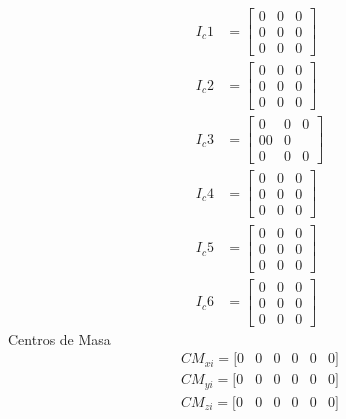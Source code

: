 \documentclass[journal]{IEEEtran}
\begin{document}
    \begin{align*}
    I_c{1} & =\begin{bmatrix}
    0 &	0 &	0 \\ 0 &	0 &	0 \\
    0 &	0 &	0\end{bmatrix} \\
    I_c{2} & =\begin{bmatrix}
    0 &	0 &	0    \\
    0  &	0 &	0 \\
    0	& 0 &	0\end{bmatrix} \\
    I_c{3} & =\begin{bmatrix}
    0 &	0	& 0 \\0	0 & 0 \\
    0 & 0 & 0\end{bmatrix}\\
    I_c{4} & =\begin{bmatrix}
    0 &	0 & 0 \\
    0 & 0 &	0\\
    0 & 0 &	0\end{bmatrix}\\
    I_c{5} & =\begin{bmatrix}
    0 &	0 & 0\\
    0 &	0 & 0\\ 
    0 & 0 & 0\end{bmatrix}\\
    I_c{6} & =\begin{bmatrix}
    0 &	0 & 0\\
    0 &	0 & 0\\ 
    0 & 0 & 0\end{bmatrix}
    \end{align*}
    Centros de Masa 
    \begin{align*}
    CM_{xi}=[0 & 0 & 0 & 0 & 0 & 0]\\
    CM_{yi}=[0 & 0 & 0 & 0 & 0 & 0]\\
    CM_{zi}=[0 & 0 & 0 & 0 & 0 & 0]\\
    \end{align*}
\end{document}
